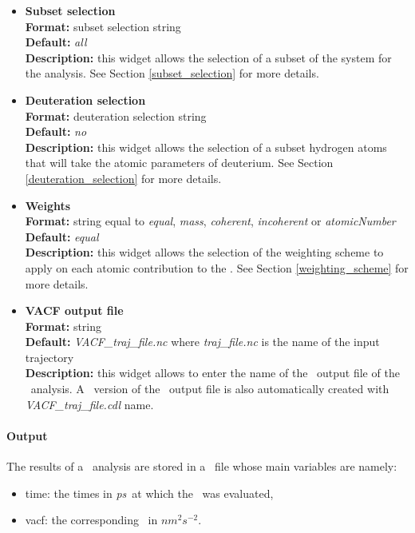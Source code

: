 \documentclass[a4paper,11pt]{report}
\newcommand{\vacfunits}{$nm^2s^{-2}$}
\newcommand{\ps}{\textit{ps}}
\begin{document}
\begin{itemize}
\item \textbf{Subset selection}\\
\textbf{Format:} subset selection string\\
\textbf{Default:} \textit{all}\\
\textbf{Description:} this widget allows the selection of a subset of the system for the analysis. 
See Section \ref{subset_selection} for more details.

\item \textbf{Deuteration selection}\\
\textbf{Format:} deuteration selection string\\
\textbf{Default:} \textit{no}\\
\textbf{Description:} this widget allows the selection of a subset hydrogen atoms that will take the atomic parameters 
of deuterium. See Section \ref{deuteration_selection} for more details.

\item \textbf{Weights}\\
\textbf{Format:} string equal to \textit{equal}, \textit{mass}, \textit{coherent}, \textit{incoherent} or \textit{atomicNumber}\\
\textbf{Default:} \textit{equal}\\
\textbf{Description:} this widget allows the selection of the weighting scheme to apply on each atomic contribution 
to the \VACF. See Section \ref{weighting_scheme} for more details. 

\item \textbf{VACF output file}\\
\textbf{Format:} string\\
\textbf{Default:} \textit{VACF\_traj\_file.nc} where \textit{traj\_file.nc} is the name of the input trajectory\\
\textbf{Description:} this widget allows to enter the name of the \NetCDF\ output file of the \VACF\ analysis. A \CDL\ 
version of the \NetCDF\ output file is also automatically created with \textit{VACF\_traj\_file.cdl} name.
\end{itemize}

\paragraph{Output\\}
The results of a \VACF\ analysis are stored in a \NetCDF\ file whose main variables are namely:
\begin{itemize}
\item time: the times in \ps\ at which the \VACF\ was evaluated,
\item vacf: the corresponding \VACF\ in \vacfunits .
\end{itemize}
\end{document}

